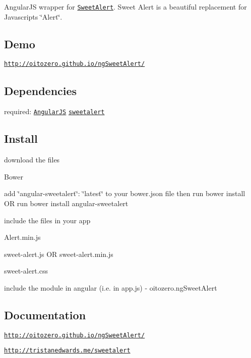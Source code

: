 Angular\+JS wrapper for \href{http://tristanedwards.me/sweetalert}{\tt Sweet\+Alert}. Sweet Alert is a beautiful replacement for Javascript\textquotesingle{}s \char`\"{}\+Alert\char`\"{}.

\subsection*{Demo}

\href{http://oitozero.github.io/ngSweetAlert/}{\tt http\+://oitozero.\+github.\+io/ng\+Sweet\+Alert/}

\subsection*{Dependencies}


\begin{DoxyItemize}
\item required\+: \href{https://github.com/angular/angular}{\tt Angular\+JS} \href{https://github.com/t4t5/sweetalert}{\tt sweetalert}
\end{DoxyItemize}

\subsection*{Install}


\begin{DoxyEnumerate}
\item download the files
\begin{DoxyEnumerate}
\item Bower
\begin{DoxyEnumerate}
\item add {\ttfamily \char`\"{}angular-\/sweetalert\char`\"{}\+: \char`\"{}latest\char`\"{}} to your {\ttfamily bower.\+json} file then run {\ttfamily bower install} OR run {\ttfamily bower install angular-\/sweetalert}
\end{DoxyEnumerate}
\end{DoxyEnumerate}
\item include the files in your app
\begin{DoxyEnumerate}
\item {\ttfamily Alert.\+min.\+js}
\item {\ttfamily sweet-\/alert.\+js} OR {\ttfamily sweet-\/alert.\+min.\+js}
\item {\ttfamily sweet-\/alert.\+css}
\end{DoxyEnumerate}
\item include the module in angular (i.\+e. in {\ttfamily app.\+js}) -\/ {\ttfamily oitozero.\+ng\+Sweet\+Alert}
\end{DoxyEnumerate}

\subsection*{Documentation}


\begin{DoxyItemize}
\item \href{http://oitozero.github.io/ngSweetAlert/}{\tt http\+://oitozero.\+github.\+io/ng\+Sweet\+Alert/}
\item \href{http://tristanedwards.me/sweetalert}{\tt http\+://tristanedwards.\+me/sweetalert} 
\end{DoxyItemize}